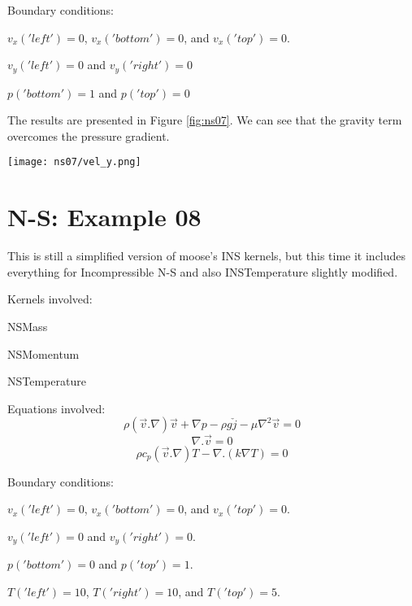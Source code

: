 \documentclass[11pt,letterpaper]{article}
\begin{document}
Boundary conditions:
\begin{description}[]
	\item[] $v_{x}('left')=0$, $v_{x}('bottom')=0$, and $v_{x}('top')=0$.
	\item[] $v_{y}('left')=0$ and $v_{y}('right')=0$
	\item[] $p('bottom')=1$ and $p('top')=0$
\end{description}

The results are presented in Figure \ref{fig:ns07}. We can see that the gravity term overcomes the pressure gradient.
\begin{figure*}[!h]
	\centering
	\texttt{[image: ns07/vel\_y.png]} 
	\hfill
	\caption{Velocity.}
	\label{fig:ns07}
\end{figure*}

\section{N-S: Example 08}

This is still a simplified version of moose's INS kernels, but this time it includes everything for Incompressible N-S and also INSTemperature slightly modified.

Kernels involved:
\begin{description}[font=$\bullet$\scshape\bfseries]
	\item[] NSMass
	\item[] NSMomentum
	\item[] NSTemperature
\end{description}

Equations involved:
\begin{equation}
\rho (\vec{v}.\nabla)\vec{v} + \nabla p - \rho g \check{j} - \mu \nabla^{2}\vec{v} = 0
\end{equation}
\begin{equation}
\nabla.\vec{v}=0
\end{equation}
\begin{equation}
\rho c_{p} (\vec{v}.\nabla)T - \nabla .(k\nabla T) = 0
\end{equation}

Boundary conditions:
\begin{description}[]
	\item[] $v_{x}('left')=0$, $v_{x}('bottom')=0$, and $v_{x}('top')=0$.
	\item[] $v_{y}('left')=0$ and $v_{y}('right')=0$.
	\item[] $p('bottom')=0$ and $p('top')=1$.
	\item[] $T('left')=10$, $T('right')=10$, and $T('top')=5$.
\end{description}
\end{document}
